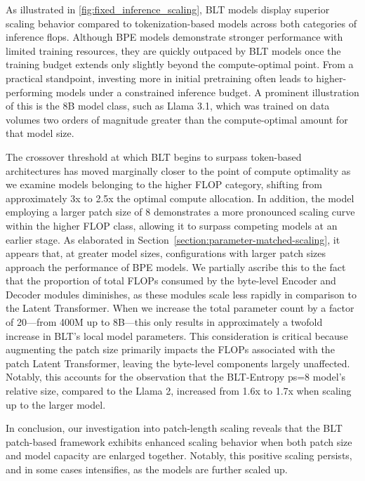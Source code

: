 As illustrated in \autoref{fig:fixed_inference_scaling}, {\textsc BLT} models display superior scaling behavior compared to tokenization-based models across both categories of inference flops. Although BPE models demonstrate stronger performance with limited training resources, they are quickly outpaced by {\textsc BLT} models once the training budget extends only slightly beyond the compute-optimal point. From a practical standpoint, investing more in initial pretraining often leads to higher-performing models under a constrained inference budget. A prominent illustration of this is the 8B model class, such as Llama 3.1, which was trained on data volumes two orders of magnitude greater than the compute-optimal amount for that model size.

The crossover threshold at which {\textsc BLT} begins to surpass token-based architectures has moved marginally closer to the point of compute optimality as we examine models belonging to the higher FLOP category, shifting from approximately 3x to 2.5x the optimal compute allocation. In addition, the model employing a larger patch size of 8 demonstrates a more pronounced scaling curve within the higher FLOP class, allowing it to surpass competing models at an earlier stage. As elaborated in Section~\ref{section:parameter-matched-scaling}, it appears that, at greater model sizes, configurations with larger patch sizes approach the performance of BPE models. We partially ascribe this to the fact that the proportion of total FLOPs consumed by the byte-level Encoder and Decoder modules diminishes, as these modules scale less rapidly in comparison to the Latent Transformer. When we increase the total parameter count by a factor of 20—from 400M up to 8B—this only results in approximately a twofold increase in {\textsc BLT}'s local model parameters. This consideration is critical because augmenting the patch size primarily impacts the FLOPs associated with the patch Latent Transformer, leaving the byte-level components largely unaffected. Notably, this accounts for the observation that the {\textsc BLT}-Entropy ps=8 model’s relative size, compared to the Llama 2, increased from 1.6x to 1.7x when scaling up to the larger model.

In conclusion, our investigation into patch-length scaling reveals that the {\textsc BLT} patch-based framework exhibits enhanced scaling behavior when both patch size and model capacity are enlarged together. Notably, this positive scaling persists, and in some cases intensifies, as the models are further scaled up.

